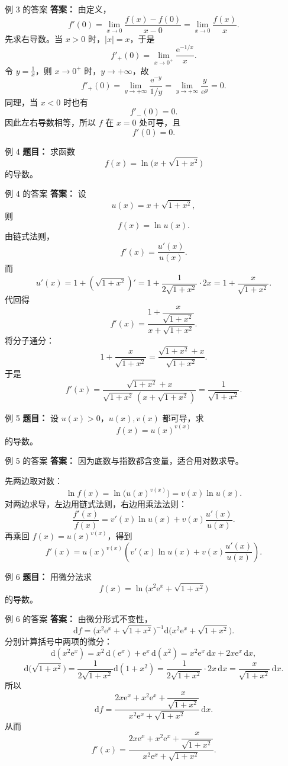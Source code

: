 ﻿\documentclass[aspectratio=169,11pt]{ctexbeamer}
\newcommand{\e}{\mathrm{e}}
\newcommand{\dx}{\,\mathrm{d}x}
\begin{document}
\begin{frame}{例 3 的答案}
\small
\textbf{答案：} 由定义，
\[
f'(0)=\lim_{x\to 0}\frac{f(x)-f(0)}{x-0}
=\lim_{x\to 0}\frac{f(x)}{x}.
\]
先求右导数。当 $x>0$ 时，$|x|=x$，于是
\[
f'_+(0)=\lim_{x\to 0^+}\frac{\e^{-1/x}}{x}.
\]
令 $y=\frac{1}{x}$，则 $x\to 0^+$ 时，$y\to +\infty$，故
\[
f'_+(0)=\lim_{y\to +\infty}\frac{\e^{-y}}{1/y}
=\lim_{y\to +\infty}\frac{y}{\e^y}=0.
\]
同理，当 $x<0$ 时也有
\[
f'_-(0)=0.
\]
因此左右导数相等，所以 $f$ 在 $x=0$ 处可导，且
\[
f'(0)=0.
\]
\end{frame}

\begin{frame}{例 4}
\small
\textbf{题目：} 求函数
\[
f(x)=\ln\!\bigl(x+\sqrt{1+x^2}\bigr)
\]
的导数。
\end{frame}

\begin{frame}[allowframebreaks]{例 4 的答案}
\small
\textbf{答案：} 设
\[
u(x)=x+\sqrt{1+x^2},
\]
则
\[
f(x)=\ln u(x).
\]
由链式法则，
\[
f'(x)=\frac{u'(x)}{u(x)}.
\]
而
\[
u'(x)=1+\left(\sqrt{1+x^2}\right)'
=1+\frac{1}{2\sqrt{1+x^2}}\cdot 2x
=1+\frac{x}{\sqrt{1+x^2}}.
\]
代回得
\[
f'(x)=\frac{1+\dfrac{x}{\sqrt{1+x^2}}}{x+\sqrt{1+x^2}}.
\]
将分子通分：
\[
1+\frac{x}{\sqrt{1+x^2}}
=\frac{\sqrt{1+x^2}+x}{\sqrt{1+x^2}}.
\]
于是
\[
f'(x)=\frac{\sqrt{1+x^2}+x}{\sqrt{1+x^2}\,(x+\sqrt{1+x^2})}
=\frac{1}{\sqrt{1+x^2}}.
\]
\end{frame}

\begin{frame}{例 5}
\small
\textbf{题目：} 设 $u(x)>0$，$u(x),v(x)$ 都可导，求
\[
f(x)=u(x)^{v(x)}
\]
的导数。
\end{frame}

\begin{frame}{例 5 的答案}
\small
\textbf{答案：} 因为底数与指数都含变量，适合用对数求导。

先两边取对数：
\[
\ln f(x)=\ln\bigl(u(x)^{v(x)}\bigr)=v(x)\ln u(x).
\]
对两边求导，左边用链式法则，右边用乘法法则：
\[
\frac{f'(x)}{f(x)}=v'(x)\ln u(x)+v(x)\frac{u'(x)}{u(x)}.
\]
再乘回 $f(x)=u(x)^{v(x)}$，得到
\[
f'(x)=u(x)^{v(x)}
\left(v'(x)\ln u(x)+v(x)\frac{u'(x)}{u(x)}\right).
\]
\end{frame}

\begin{frame}{例 6}
\small
\textbf{题目：} 用微分法求
\[
f(x)=\ln\!\bigl(x^2\e^x+\sqrt{1+x^2}\bigr)
\]
的导数。
\end{frame}

\begin{frame}{例 6 的答案}
\small
\textbf{答案：} 由微分形式不变性，
\[
\mathrm{d}f=\bigl(x^2\e^x+\sqrt{1+x^2}\bigr)^{-1}
\mathrm{d}\!\bigl(x^2\e^x+\sqrt{1+x^2}\bigr).
\]
分别计算括号中两项的微分：
\[
\mathrm{d}(x^2\e^x)=x^2\,\mathrm{d}(\e^x)+\e^x\,\mathrm{d}(x^2)
=x^2\e^x\dx+2x\e^x\dx,
\]
\[
\mathrm{d}\!\bigl(\sqrt{1+x^2}\bigr)
=\frac{1}{2\sqrt{1+x^2}}\mathrm{d}(1+x^2)
=\frac{1}{2\sqrt{1+x^2}}\cdot 2x\dx
=\frac{x}{\sqrt{1+x^2}}\dx.
\]
所以
\[
\mathrm{d}f=
\frac{2x\e^x+x^2\e^x+\dfrac{x}{\sqrt{1+x^2}}}
{x^2\e^x+\sqrt{1+x^2}}\dx.
\]
从而
\[
f'(x)=
\frac{2x\e^x+x^2\e^x+\dfrac{x}{\sqrt{1+x^2}}}
{x^2\e^x+\sqrt{1+x^2}}.
\]
\end{frame}
\end{document}
